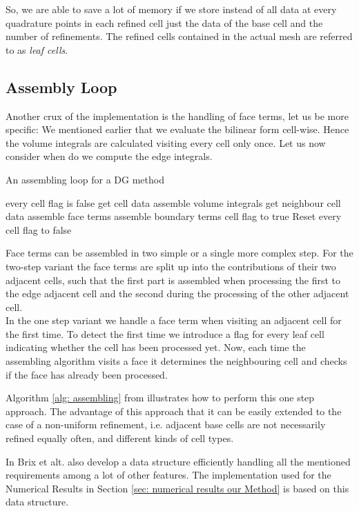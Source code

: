 \begin{example}
So, we are able to save a lot of memory if we store instead of all data at every quadrature points in each refined cell just the data of the base cell and the number of refinements. The refined cells contained in the actual mesh are referred to as \emph{leaf cells}.
\end{example}

\subsection{Assembly Loop}\label{subsec: assembly loop}
Another crux of the implementation is the handling of face terms, let us be more specific: We mentioned earlier that we evaluate the bilinear form cell-wise. Hence the volume integrals are calculated visiting every cell only once. Let us now consider when do we compute the edge integrals.\\
\begin{algorithm}[H]
\caption{An assembling loop for a DG method}
\label{alg: assembling}
\begin{algorithmic}
\Ensure every cell flag is false
\State get cell data
\State assemble volume integrals 
					\State get neighbour cell data
					\State assemble face terms
			\EndIf
		\Else
			\State assemble boundary terms
		\EndIf
\EndFor
	\State cell flag to true 
\EndFor
\State Reset every cell flag to false
\end{algorithmic}
\end{algorithm}
Face terms can be assembled in two simple or a single more complex step.
For the two-step variant the face terms are split up into the contributions of their two adjacent cells, such that the first part is assembled when processing the first to the edge adjacent cell and the second during the processing of the other adjacent cell. \\
In the one step variant we handle a face term when visiting an adjacent cell for the first time. To detect the first time we introduce a flag for every leaf cell indicating whether the cell has been processed yet. Now, each time the assembling algorithm visits a face it determines the neighbouring cell and checks if the face has already been processed. 

Algorithm \ref{alg: assembling} from \cite{BMV2009} illustrates how to perform this one step approach. 
The advantage of this approach that it can be easily extended to the case of a non-uniform refinement, i.e. adjacent base cells are not necessarily refined equally often, and different kinds of cell types.

In \cite{BMV2009} Brix et alt. also develop a data structure efficiently handling all the mentioned requirements among a lot of other features. The implementation used for the Numerical Results in Section \ref{sec: numerical results our Method} is based on this data structure.